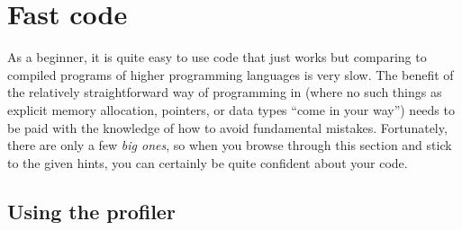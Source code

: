 %
%
%
%
%
\newpage
\section{Fast code}

As a \matlab{} beginner, it is quite easy to use code that just
works\texttrademark{} but comparing to compiled programs of higher programming
languages is very slow. The benefit of the relatively straightforward way of
programming in \matlab{} (where no such things as explicit memory allocation,
pointers, or data types ``come in your way'') needs to be paid with the
knowledge of how to avoid fundamental mistakes. Fortunately, there are only a
few \emph{big ones}, so when you browse through this section and stick to the
given hints, you can certainly be quite confident about your code.

\subsection{Using the profiler}


